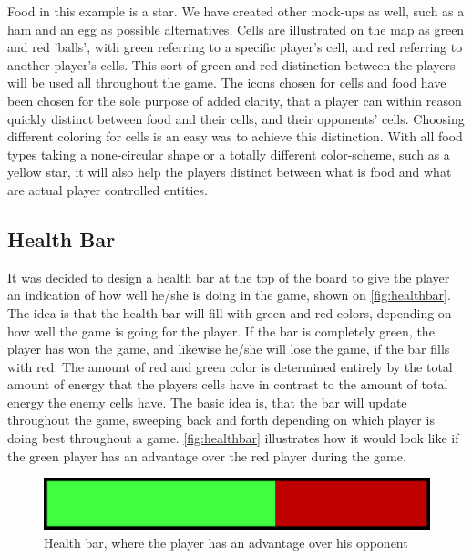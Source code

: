 Food in this example is a star.
We have created other mock-ups as well, such as a ham and an egg as possible alternatives. 
Cells are illustrated on the map as green and red 'balls', with green referring to a specific player's cell, and red referring to another player's cells.
This sort of green and red distinction between the players will be used all throughout the game.
The icons chosen for cells and food have been chosen for the sole purpose of added clarity, that a player can within reason quickly distinct between food and their cells, and their opponents' cells.
Choosing different coloring for cells is an easy was to achieve this distinction.
With all food types taking a none-circular shape or a totally different color-scheme, such as a yellow star, it will also help the players distinct between what is food and what are actual player controlled entities.

\subsection{Health Bar}
It was decided to design a health bar at the top of the board to give the player an indication of how well he/she is doing in the game, shown on \autoref{fig:healthbar}.
The idea is that the health bar will fill with green and red colors, depending on how well the game is going for the player.
If the bar is completely green, the player has won the game, and likewise he/she will lose the game, if the bar fills with red.
The amount of red and green color is determined entirely by the total amount of energy that the players cells have in contrast to the amount of total energy the enemy cells have.
The basic idea is, that the bar will update throughout the game, sweeping back and forth depending on which player is doing best throughout a game.
\autoref{fig:healthbar} illustrates how it would look like if the green player has an advantage over the red player during the game.

\begin{figure}[h]
	\centering
		\includegraphics{img/healthbar_example.png}
	\caption{Health bar, where the player has an advantage over his opponent}
	\label{fig:healthbar}
\end{figure}

